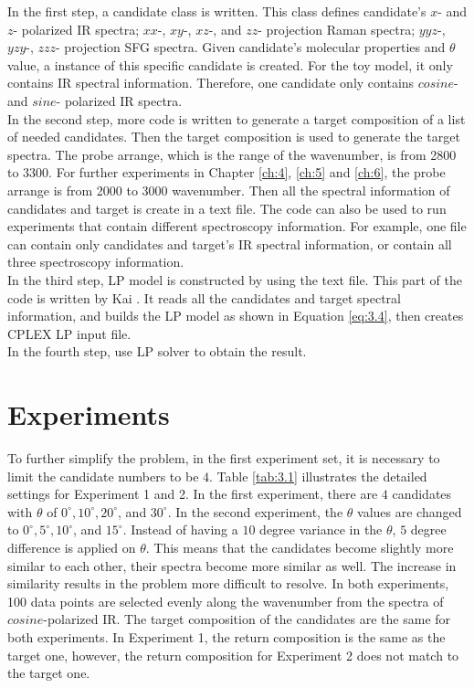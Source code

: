 In the first step, a candidate class is written. This class defines candidate's $x$- and $z$- polarized IR spectra; $xx$-, $xy$-, $xz$-, and $zz$- projection Raman spectra; $yyz$-, $yzy$-, $zzz$- projection SFG spectra. Given candidate's molecular properties and $\theta$ value, a instance of this specific candidate is created. For the toy model, it only contains IR spectral information. Therefore, one candidate only contains $cosine$- and $sine$- polarized IR spectra. \\

In the second step, more code is written to generate a target composition of a list of needed candidates. Then the target composition is used to generate the target spectra. The probe arrange, which is the range of the wavenumber, is from 2800 to 3300. For further experiments in Chapter \ref{ch:4}, \ref{ch:5} and \ref{ch:6}, the probe arrange is from 2000 to 3000 wavenumber. Then all the spectral information of candidates and target is create in a text file. The code can also be used to run experiments that contain different spectroscopy information. For example, one file can contain only candidates and target's IR spectral information, or contain all three spectroscopy information. \\

In the third step, LP model is constructed by using the text file. This part of the code is written by Kai \cite{KuoKaiHung:Thesis:2015}. It reads all the candidates and target spectral information, and builds the LP model as shown in Equation \ref{eq:3.4}, then creates CPLEX LP input file. \\

In the fourth step, use LP solver to obtain the result. \\

\section{Experiments}
To further simplify the problem, in the first experiment set, it is necessary to limit the candidate numbers to be $4$. Table \ref{tab:3.1} illustrates the detailed settings for Experiment 1 and 2. In the first experiment, there are $4$ candidates with $\theta$ of $0^{\circ}, 10^{\circ}, 20^{\circ}$, and $30^{\circ}$. In the second experiment, the $\theta$ values are changed to $0^{\circ}, 5^{\circ}, 10^{\circ}$, and $15^{\circ}$. Instead of having a $10$ degree variance in the $\theta$, $5$ degree difference is applied on $\theta$. This means that the candidates become slightly more similar to each other, their spectra become more similar as well. The increase in similarity results in the problem more difficult to resolve. In both experiments, 100 data points are selected evenly along the wavenumber from the spectra of $cosine$-polarized IR. The target composition of the candidates are the same for both experiments. In Experiment 1, the return composition is the same as the target one, however, the return composition for Experiment 2 does not match to the target one. 

